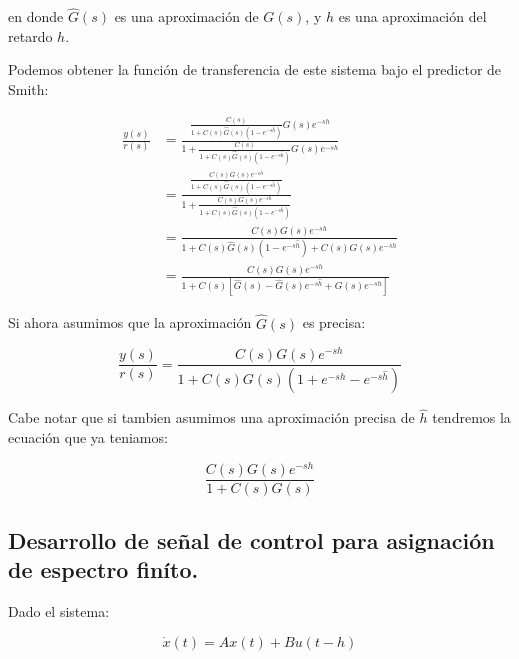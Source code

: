             en donde $\hat{G}(s)$ es una aproximación de $G(s)$, y $\hat{h}$ es una aproximación del retardo $h$.

            Podemos obtener la función de transferencia de este sistema bajo el predictor de Smith:

            \begin{align*}
                \frac{y(s)}{r(s)} &= \frac{\frac{C(s)}{1 + C(s)\hat{G}(s)\left( 1 - e^{-s\hat{h}} \right)}G(s)e^{-sh}}{1 + \frac{C(s)}{1 + C(s)\hat{G}(s)\left( 1 - e^{-s\hat{h}} \right)}G(s)e^{-sh}} \\
                &= \frac{\frac{C(s)G(s)e^{-sh}}{1 + C(s)\hat{G}(s)\left( 1 - e^{-s\hat{h}} \right)}}{1 + \frac{C(s)G(s)e^{-sh}}{1 + C(s)\hat{G}(s)\left( 1 - e^{-s\hat{h}} \right)}} \\
                &= \frac{C(s)G(s)e^{-sh}}{1 + C(s)\hat{G}(s)\left( 1 - e^{-s\hat{h}} \right) + C(s)G(s)e^{-sh}} \\
                &= \frac{C(s)G(s)e^{-sh}}{1 + C(s) \left[ \hat{G}(s) - \hat{G}(s)e^{-s\hat{h}} + G(s)e^{-sh} \right]}
            \end{align*}

            Si ahora asumimos que la aproximación $\hat{G}(s)$ es precisa:

            \begin{equation}
                \frac{y(s)}{r(s)} = \frac{C(s)G(s)e^{-sh}}{1 + C(s) G(s) \left( 1 + e^{-sh} - e^{-s\hat{h}} \right)}
            \end{equation}

            Cabe notar que si tambien asumimos una aproximación precisa de $\hat{h}$ tendremos la ecuación que ya teniamos:

            \begin{equation}
                \frac{C(s)G(s)e^{-sh}}{1 + C(s)G(s)}
            \end{equation}

        \subsection*{Desarrollo de señal de control para asignación de espectro finíto\cite{Manitius1979}.}

            Dado el sistema:

            \begin{equation}
                \dot{x}(t) = A x(t) + B u(t - h)
            \end{equation}


